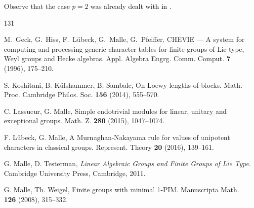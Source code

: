 \documentclass{ert-l}
\theoremstyle{remark}
\begin{document}
Observe that the case $p=2$ was already dealt with in \cite[Thm.~4.5]{KKS}.


\begin{thebibliography}{131}

{\sc M.~Geck, G.~Hiss, F.~L\"ubeck, G.~Malle, G.~Pfeiffer},
  {\sf CHEVIE} --- A system for computing and processing generic character
  tables for finite groups of Lie type, Weyl groups and Hecke algebras.
  Appl. Algebra Engrg. Comm. Comput. {\bf7} (1996), 175--210.

{\sc S. Koshitani, B. K\"ulshammer, B. Sambale}, On Loewy lengths of blocks.
  Math. Proc. Cambridge Philos. Soc. {\bf156} (2014), 555--570.

{\sc C. Lassueur, G. Malle}, Simple endotrivial modules for linear, unitary
  and exceptional groups. Math. Z. {\bf280} (2015), 1047--1074.
  
{\sc F. L\"ubeck, G. Malle}, A Murnaghan-Nakayama rule for values of unipotent
  characters in classical groups. Represent. Theory {\bf20} (2016), 139--161.
  
{\sc G. Malle, D. Testerman}, \emph{Linear Algebraic Groups and Finite Groups
  of Lie Type}. Cambridge University Press, Cambridge, 2011.

{\sc G. Malle, Th. Weigel}, Finite groups with minimal 1-PIM. Manuscripta
  Math. {\bf126} (2008), 315--332.
  
\end{thebibliography}
\end{document}
